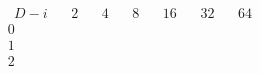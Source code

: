 \documentclass{article}
\begin{document}
{$$
\begin{array}{|r|*{6}{r|}}
\hline
\ \ D-i \ \ &\ \ 2\ \ &\ \ 4\ \ &\ \ 8\ \ &\ \ 16\ \ &\ \ 32\ \ &\ \ 64\ \ \\
\hline
0 
 & 
 & 
 & 
 & 
 & 
 & 
\\
\hline
1 
 & 
 & 
 & 
 & 
 & 
 & 
\\
\hline
2 
 & 
 & 
 & 

\end{array}$$}
\end{document}
